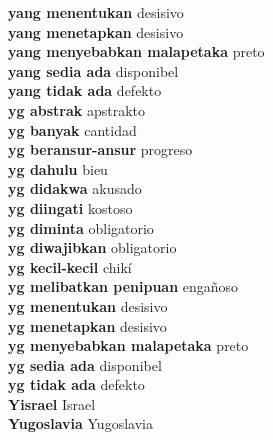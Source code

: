 \textbf{ yang menentukan  } desisivo \\
\textbf{ yang menetapkan  } desisivo \\
\textbf{ yang menyebabkan malapetaka  } preto \\
\textbf{ yang sedia ada  } disponibel \\
\textbf{ yang tidak ada  } defekto \\
\textbf{ yg abstrak  } apstrakto \\
\textbf{ yg banyak  } cantidad \\
\textbf{ yg beransur-ansur  } progreso \\
\textbf{ yg dahulu  } bieu \\
\textbf{ yg didakwa  } akusado \\
\textbf{ yg diingati  } kostoso \\
\textbf{ yg diminta  } obligatorio \\
\textbf{ yg diwajibkan  } obligatorio \\
\textbf{ yg kecil-kecil  } chikí \\
\textbf{ yg melibatkan penipuan  } engañoso \\
\textbf{ yg menentukan  } desisivo \\
\textbf{ yg menetapkan  } desisivo \\
\textbf{ yg menyebabkan malapetaka  } preto \\
\textbf{ yg sedia ada  } disponibel \\
\textbf{ yg tidak ada  } defekto \\
\textbf{ Yisrael  } Israel \\
\textbf{ Yugoslavia  } Yugoslavia \\
